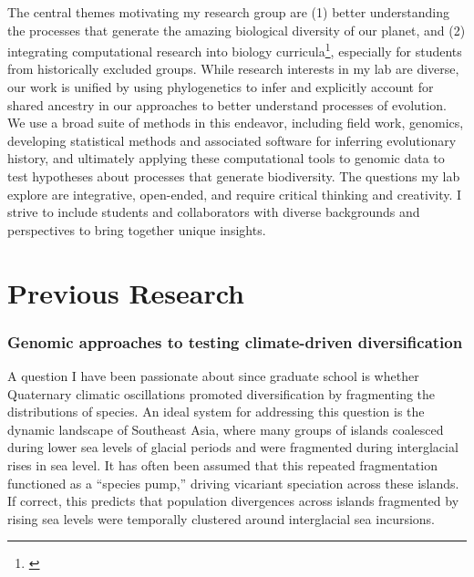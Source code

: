 \noindent
The central themes motivating my research group are
(1) better understanding the processes that generate the amazing biological
diversity of our planet,
and
(2) integrating computational research into biology
curricula\footnote{\label{Wright19}\hspace{-0.8em}},
especially for students from historically excluded groups.
While research interests in my lab are diverse, our work is unified by using
phylogenetics to infer and explicitly account for shared ancestry in our
approaches to better understand processes of evolution.
We use a broad suite of methods in this endeavor, including
field work,
genomics,
developing statistical methods and associated software for inferring
evolutionary history, and ultimately applying these computational tools to
genomic data to test
hypotheses about processes that generate biodiversity.
The questions my lab explore are integrative, open-ended, and require critical
thinking and creativity.
I strive to include students and collaborators with diverse backgrounds and
perspectives to bring together unique insights.

\section*{Previous Research}
\subsubsection*{Genomic approaches to testing climate-driven diversification}
A question I have been passionate about since graduate school is whether
Quaternary climatic oscillations promoted diversification by fragmenting the
distributions of species.
An ideal system for addressing this question is the dynamic landscape of
Southeast Asia, where many groups of islands coalesced during lower sea levels
of glacial periods and were fragmented during interglacial rises in sea level.
It has often been assumed that this repeated fragmentation functioned as a
``species pump,'' driving vicariant speciation across these islands.
If correct, this predicts that population divergences across islands fragmented
by rising sea levels were temporally clustered around interglacial sea
incursions.


